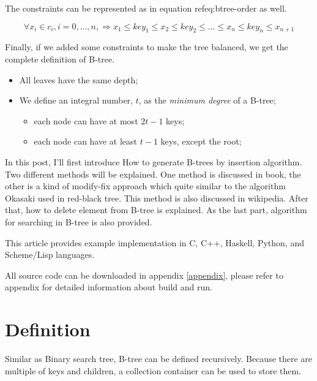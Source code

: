 \documentclass{article}
\begin{document}
The constraints can be represented as in equation ref{eq:btree-order}
as well.

\begin{equation}
\forall x_i \in c_i, i=0, ..., n, \Rightarrow x_1 \leq key_1 \leq
x_2 \leq key_2 \leq ... \leq x_n \leq key_n \leq x_{n+1}
\end{equation}

Finally, if we added some constraints to make the tree balanced, we get the
complete definition of B-tree.

\begin{itemize}
\item All leaves have the same depth;
\item We define an integral number, $t$, as the {\em minimum degree} of a
B-tree;
    \begin{itemize}
        \item each node can have at most $2t-1$ keys;
        \item each node can have at least $t-1$ keys, except the root;
    \end{itemize}
\end{itemize}

In this post, I'll first introduce How to generate B-trees by insertion
algorithm. Two different methods will be explained. One method is discussed in \cite{CLRS}
book, the other is a kind of modify-fix approach which quite similar to the
algorithm Okasaki used in red-black tree\cite{okasaki-rbtree}. This method
is also discussed in wikipedia\cite{wiki-b-tree}. After that, how to delete
element from B-tree is explained. As the last part, algorithm for searching
in B-tree is also provided.

This article provides example implementation in C, C++, Haskell, Python, and
Scheme/Lisp languages.

All source code can be downloaded in appendix \ref{appendix}, please
refer to appendix for detailed information about build and run.

\section{Definition}
\label{btree-definition}

Similar as Binary search tree, B-tree can be defined recursively.
Because there are multiple of keys and children, a collection container
can be used to store them.
\end{document}
